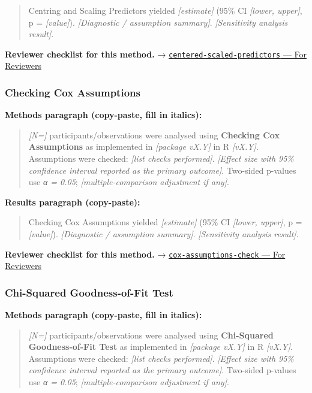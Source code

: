 \documentclass[
]{article}
\begin{document}
\begin{quote}
Centring and Scaling Predictors yielded \emph{{[}estimate{]}} (95\% CI
\emph{{[}lower, upper{]}}, p = \emph{{[}value{]}}). \emph{{[}Diagnostic
/ assumption summary{]}}. \emph{{[}Sensitivity analysis result{]}}.
\end{quote}

\textbf{Reviewer checklist for this method.} →
\href{../chapters/07-regression/centered-scaled-predictors.Rmd\#for-reviewers}{\texttt{centered-scaled-predictors}
--- For Reviewers}

\subsubsection{Checking Cox Assumptions}\label{checking-cox-assumptions}

\textbf{Methods paragraph (copy-paste, fill in italics):}

\begin{quote}
\emph{{[}N={]}} participants/observations were analysed using
\textbf{Checking Cox Assumptions} as implemented in \emph{{[}package
vX.Y{]}} in R \emph{{[}vX.Y{]}}. Assumptions were checked: \emph{{[}list
checks performed{]}}. \emph{{[}Effect size with 95\% confidence interval
reported as the primary outcome{]}}. Two-sided p-values use \emph{α =
0.05}; \emph{{[}multiple-comparison adjustment if any{]}}.
\end{quote}

\textbf{Results paragraph (copy-paste):}

\begin{quote}
Checking Cox Assumptions yielded \emph{{[}estimate{]}} (95\% CI
\emph{{[}lower, upper{]}}, p = \emph{{[}value{]}}). \emph{{[}Diagnostic
/ assumption summary{]}}. \emph{{[}Sensitivity analysis result{]}}.
\end{quote}

\textbf{Reviewer checklist for this method.} →
\href{../chapters/11-survival/cox-assumptions-check.Rmd\#for-reviewers}{\texttt{cox-assumptions-check}
--- For Reviewers}

\subsubsection{Chi-Squared Goodness-of-Fit
Test}\label{chi-squared-goodness-of-fit-test}

\textbf{Methods paragraph (copy-paste, fill in italics):}

\begin{quote}
\emph{{[}N={]}} participants/observations were analysed using
\textbf{Chi-Squared Goodness-of-Fit Test} as implemented in
\emph{{[}package vX.Y{]}} in R \emph{{[}vX.Y{]}}. Assumptions were
checked: \emph{{[}list checks performed{]}}. \emph{{[}Effect size with
95\% confidence interval reported as the primary outcome{]}}. Two-sided
p-values use \emph{α = 0.05}; \emph{{[}multiple-comparison adjustment if
any{]}}.
\end{quote}
\end{document}
